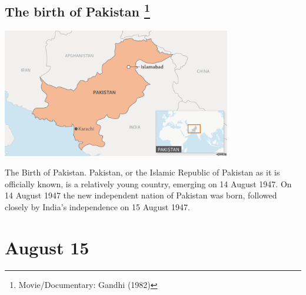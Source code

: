 \documentclass[11pt]{report}
\begin{document}
\subsection{The birth of Pakistan \protect\footnote{Movie/Documentary: Gandhi (1982)}}
\vspace{2mm}\begin{center}\includegraphics[width=10cm]{./img/pakistan.png}\end{center}
The Birth of Pakistan. Pakistan, or the Islamic Republic of Pakistan as it is officially known, is a relatively young country, emerging on 14 August 1947. On 14 August 1947 the new independent nation of Pakistan was born, followed closely by India's independence on 15 August 1947.

\section{August 15}
\end{document}

